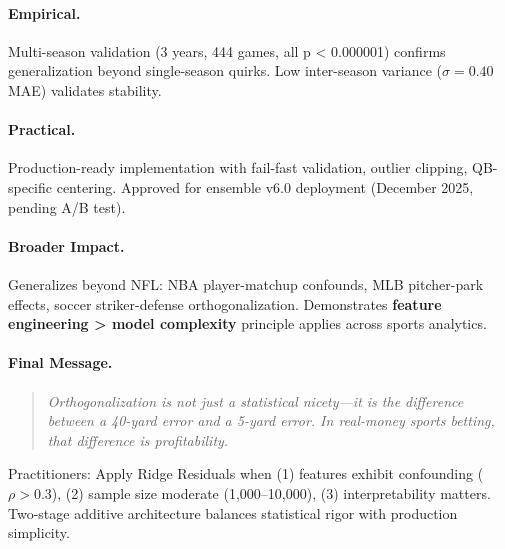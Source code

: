 \paragraph{Empirical.}
Multi-season validation (3 years, 444 games, all p < 0.000001) confirms generalization beyond single-season quirks. Low inter-season variance ($\sigma = 0.40$ MAE) validates stability.

\paragraph{Practical.}
Production-ready implementation with fail-fast validation, outlier clipping, QB-specific centering. Approved for ensemble v6.0 deployment (December 2025, pending A/B test).

\paragraph{Broader Impact.}
Generalizes beyond NFL: NBA player-matchup confounds, MLB pitcher-park effects, soccer striker-defense orthogonalization. Demonstrates \textbf{feature engineering > model complexity} principle applies across sports analytics.

\paragraph{Final Message.}
\begin{quote}
\emph{Orthogonalization is not just a statistical nicety---it is the difference between a 40-yard error and a 5-yard error. In real-money sports betting, that difference is profitability.}
\end{quote}

Practitioners: Apply Ridge Residuals when (1) features exhibit confounding ($\rho > 0.3$), (2) sample size moderate (1,000--10,000), (3) interpretability matters. Two-stage additive architecture balances statistical rigor with production simplicity.
